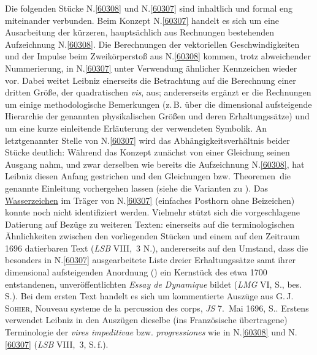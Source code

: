 \vspace{5mm}
\begin{ledgroup}
\footnotesize
\pstart
\noindent%
Die folgenden Stücke N.\;\ref{60308} und N.\;\ref{60307} sind inhaltlich und formal eng miteinander verbunden. 
Beim Konzept N.\;\ref{60307} handelt es sich um eine Ausarbeitung der kürzeren, hauptsächlich aus Rechnungen bestehenden Aufzeichnung N.\;\ref{60308}.
Die Berechnungen der vektoriellen Geschwindigkeiten und der Impulse beim Zweikörperstoß aus N.\;\ref{60308} 
kommen, trotz abweichender Nummerierung, in N.\;\ref{60307} unter Verwendung ähnlicher Kennzeichen wieder vor. 
Dabei weitet Leibniz einerseits die Betrachtung auf die Berechnung einer dritten Größe, der quadratischen \textit{vis}, aus;
andererseits ergänzt er die Rechnungen um einige methodologische Bemerkungen (z.\,B. über die dimensional aufsteigende Hierarchie der genannten physikalischen Größen und deren Erhaltungssätze)
und um eine kurze einleitende Erläuterung der verwendeten Symbolik.
An letztgenannter Stelle von N.\;\ref{60307} wird das Abhängigkeitsverhältnis beider Stücke deutlich:
Während das Konzept zunächst von einer Gleichung seinen Ausgang nahm, und zwar derselben wie bereits die Aufzeichnung N.\;\ref{60308},
hat Leibniz diesen Anfang gestrichen und den Gleichungen bzw. \glqq Theoremen\grqq\ die genannte Einleitung vorhergehen lassen (siehe die Varianten zu ).
\pend
\pstart
Das \href{\Scan{LH_37_05_062wz}}%
{Wasserzeichen} im Träger von N.\;\ref{60307} (einfaches Posthorn ohne Beizeichen) 
konnte noch nicht identifiziert werden.
Vielmehr stützt sich die vorgeschlagene Datierung auf Bezüge zu weiteren Texten: 
einerseits auf die terminologischen Ähnlichkeiten zwischen den vorliegenden Stücken und einem auf den Zeitraum 1696 datierbaren Text (\cite{02147}\textit{LSB} VIII,~3 N.),
andererseits auf den Umstand, dass die besonders in N.\;\ref{60307} ausgearbeitete Liste dreier Erhaltungssätze samt ihrer dimensional aufsteigenden Anordnung () 
ein Kernstück des etwa 1700 entstandenen, unveröffentlichten \cite{02181}\textit{Essay de Dynamique} bildet (\textit{LMG} VI, S., bes. S.).
\pend
\pstart
Bei dem ersten Text handelt es sich um 
\cite{02147}kommentierte Auszüge aus
G.\,J.\,\textsc{Sohier}, 
\cite{00526}\glqq Nouveau systeme de la percussion des corps\grqq,
\cite{00157}\textit{JS} 7.~Mai 1696, S..
Erstens verwendet Leibniz in den Auszügen dieselbe (ins Französische übertragene) Terminologie der \textit{vires impeditivae} bzw. \textit{progressiones} wie in N.\;\ref{60308} und N.\;\ref{60307} (\textit{LSB} VIII,~3, S.\,f.). 

\end{ledgroup}
